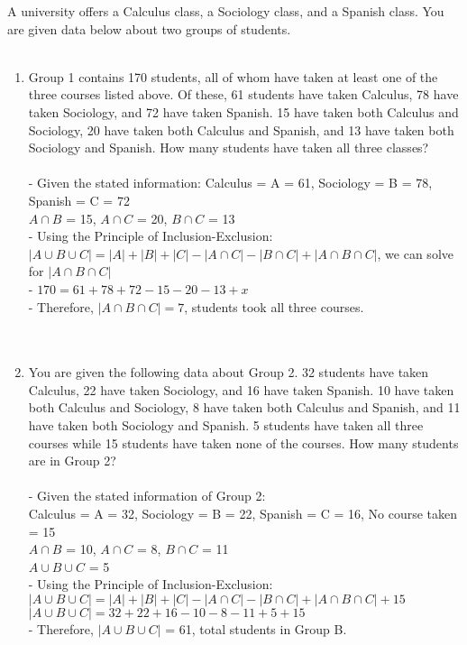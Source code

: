 \documentclass{amsart}
\theoremstyle{definition}
\theoremstyle{Exercise}
\theoremstyle{remark}
\theoremstyle{rule}
\numberwithin{equation}{section}
\begin{document}
A university offers a Calculus class, a Sociology class, and a Spanish class. You are given data below about two groups of students.\\\\
     \begin{enumerate}[label=(\roman*)]
     \item Group 1 contains 170 students, all of whom have taken at least one of the three courses listed above. Of these, 61 students have taken Calculus, 78 have taken Sociology, and 72 have taken Spanish. 15 have taken both Calculus and Sociology, 20 have taken both Calculus and Spanish, and 13 have taken both Sociology and Spanish. How many students have taken all three classes?\\\\
  - Given the stated information:
  Calculus = A = 61, Sociology = B = 78, Spanish = C = 72\\
  $A\cap{B}$ = 15, $A\cap{C}$ = 20, $B\cap{C}$ = 13\\
  - Using the Principle of Inclusion-Exclusion:\\
  $|A\cup{B}\cup{C}| = |A|+|B|+|C|-|A\cap{C}|-|B\cap{C}|+|A\cap{B}\cap{C}|$, we can solve for $|A\cap{B}\cap{C}|$\\
  - $170=61+78+72-15-20-13 + x$\\
  - Therefore, $|A\cap{B}\cap{C}| = 7$, students took all three courses. 
\\\\\
   
\item You are given the following data about Group 2. 32 students have taken Calculus, 22 have taken Sociology, and 16 have taken Spanish. 10 have taken both Calculus and Sociology, 8 have taken both Calculus and Spanish, and 11 have taken both Sociology and Spanish. 5 students have taken all three courses while 15 students have taken none of the courses. How many students are in Group 2?\\\\
  - Given the stated information of Group 2:\\
  Calculus = A = 32, Sociology = B = 22, Spanish = C = 16, No course taken = 15\\
  $A\cap{B}$ = 10, $A\cap{C}$ = 8, $B\cap{C}$ = 11\\
  $A\cup{B}\cup{C}$ = 5\\
  - Using the Principle of Inclusion-Exclusion:\\
  $|A\cup{B}\cup{C}| = |A|+|B|+|C|-|A\cap{C}|-|B\cap{C}|+|A\cap{B}\cap{C}| + 15$\\
  $|A\cup{B}\cup{C}| = 32 + 22 + 16 - 10 - 8 - 11 + 5 + 15$\\
  - Therefore, $|A\cup{B}\cup{C}|$ = 61, total students in Group B.
\\\\\
         \end{enumerate}
 \newpage
\vspace*{0.1in}
\end{document}
